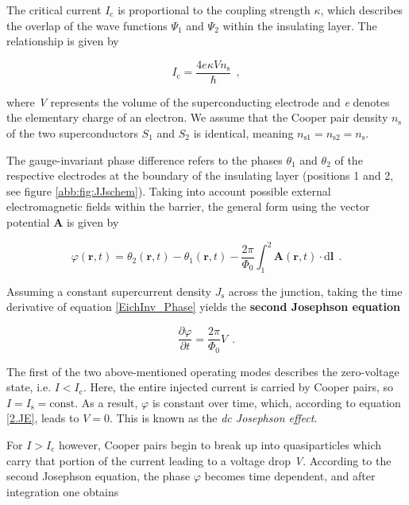 The critical current $I_\mathrm{c}$ is proportional to the coupling strength $\kappa$, which describes the overlap of the wave functions $\Psi_1$ and $\Psi_2$ within the insulating layer. The relationship is given by

\begin{equation}
I_\mathrm{c} = \frac{4e\kappa V n_\mathrm{s}}{\hbar} \ \ ,
\end{equation}

where \textit{V} represents the volume of the superconducting electrode and \textit{e} denotes the elementary charge of an electron. We assume that the Cooper pair density $n_\mathrm{s}$ of the two superconductors $S_1$ and $S_2$ is identical, meaning $n_{\mathrm{s}1} = n_{\mathrm{s}2} = n_\mathrm{s}$.

The gauge-invariant phase difference refers to the phases $\theta_1$ and $\theta_2$ of the respective electrodes at the boundary of the insulating layer (positions 1 and 2, see figure \ref{abb:fig:JJschem}). Taking into account possible external electromagnetic fields within the barrier, the general form using the vector potential \textbf{A} is given by \cite{Gross2016}

\begin{equation}
\label{EichInv_Phase}
\varphi(\textbf{r},t) = \theta_2(\textbf{r},t) - \theta_1(\textbf{r},t) - \frac{2\pi}{\Phi_0}\int_{1}^{2}\textbf{A}(\textbf{r},t)\cdot \mathrm{d}\textbf{l} \ \ .
\end{equation}

Assuming a constant supercurrent density $J_\mathrm{s}$ across the junction, taking the time derivative of equation \eqref{EichInv_Phase} yields the \textbf{second Josephson equation} \cite{Josephson1965}

\begin{equation}
\label{2.JE}
\frac{\partial\varphi}{\partial t} = \frac{2\pi}{\Phi_0}V \ \ .
\end{equation}

The first of the two above-mentioned operating modes describes the zero-voltage state, i.e.  $I<I_\mathrm{c}$. Here, the entire injected current is carried by Cooper pairs, so $I=I_\mathrm{s}=\mathrm{const}$. As a result, $\varphi$ is constant over time, which, according to equation \eqref{2.JE}, leads to $V=0$. This is known as the \textit{dc Josephson effect}.

For $I>I_\mathrm{c}$ however, Cooper pairs begin to break up into quasiparticles which carry that portion of the current leading to a voltage drop \textit{V}. According to the second Josephson equation, the phase $\varphi$ becomes time dependent, and after integration one obtains

